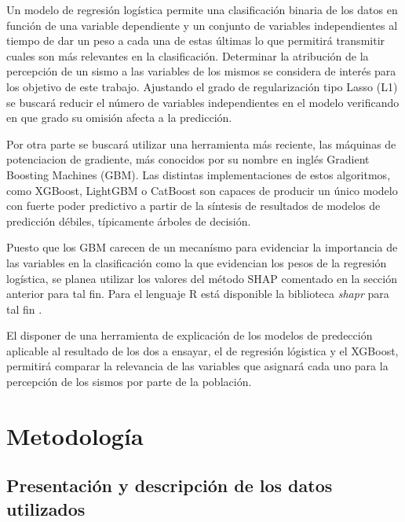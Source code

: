 \documentclass[a4paper]{report}
\begin{document}
Un modelo de regresión logística permite una clasificación binaria de los datos en función de una variable dependiente y un conjunto de variables independientes al tiempo de dar un peso a cada una de estas últimas lo que permitirá transmitir cuales son más relevantes en la clasificación.
Determinar la atribución de la percepción de un sismo a las variables de los mismos se considera de interés para los objetivo de este trabajo. 
Ajustando el grado de regularización tipo Lasso (L1) se buscará reducir el número de variables independientes en el modelo verificando en que grado su omisión afecta a la predicción.

Por otra parte se buscará utilizar una herramienta más reciente, las máquinas de potenciacion de gradiente, más conocidos por su nombre en inglés Gradient Boosting Machines (GBM).
Las distintas implementaciones de estos algoritmos, como XGBoost, LightGBM o CatBoost son capaces de producir un único modelo con fuerte poder predictivo a partir de la síntesis de resultados de modelos de predicción débiles, típicamente árboles de decisión. 

Puesto que los GBM carecen de un mecanísmo para evidenciar la importancia de las variables en la clasificación como la que evidencian los pesos de la regresión logística, se planea utilizar los valores del método SHAP comentado en la sección anterior para tal fin.
Para el lenguaje R está disponible la biblioteca \emph{shapr} para tal fin \cite{camilla_lingjaerde_shapr_nodate}.

El disponer de una herramienta de explicación de los modelos de predección aplicable al resultado de los dos a ensayar, el de regresión lógistica y el XGBoost, permitirá comparar la relevancia de las variables que asignará cada uno para la percepción de los sismos por parte de la población.



\chapter{Metodología}

\section{Presentación y descripción de los datos utilizados}
\end{document}
